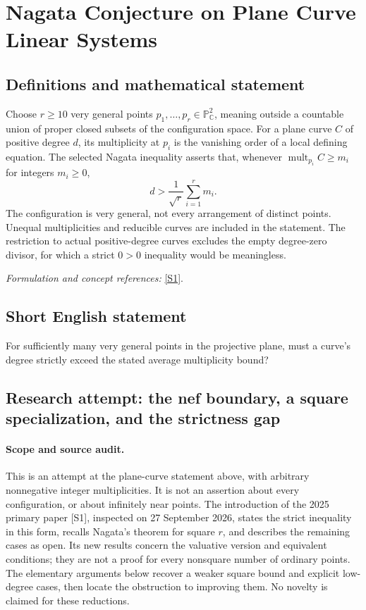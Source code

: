 \documentclass[11pt]{article}
\begin{document}
\section*{\texorpdfstring{Nagata Conjecture on Plane Curve Linear Systems}{Nagata Conjecture on Plane Curve Linear Systems}}\label{365}
\subsection{Definitions and mathematical statement}
Choose $r\ge10$ very general points $p_1,\ldots,p_r\in{\mathbb{P}}^2_{{\mathbb{C}}}$, meaning outside a countable union of proper closed subsets of the configuration space. For a plane curve $C$ of positive degree $d$, its multiplicity at $p_i$ is the vanishing order of a local defining equation. The selected Nagata inequality asserts that, whenever $\operatorname{mult}_{p_i}C\ge m_i$ for integers $m_i\ge0$,
\[
 d>\frac1{\sqrt r}\sum_{i=1}^r m_i.
\]
The configuration is very general, not every arrangement of distinct points. Unequal multiplicities and reducible curves are included in the statement. The restriction to actual positive-degree curves excludes the empty degree-zero divisor, for which a strict $0>0$ inequality would be meaningless.
\par\smallskip\textit{Formulation and concept references:} \href{https://link.springer.com/article/10.1007/s40687-025-00500-2}{[S1]}.

\subsection{Short English statement}
For sufficiently many very general points in the projective plane, must a curve's degree strictly exceed the stated average multiplicity bound?
\subsection{Research attempt: the nef boundary, a square specialization, and the strictness gap}
\paragraph{Scope and source audit.}
This is an attempt at the plane-curve statement above, with arbitrary nonnegative integer multiplicities. It is not an assertion about every configuration, or about infinitely near points. The introduction of the 2025 primary paper [S1], inspected on 27 September 2026, states the strict inequality in this form, recalls Nagata's theorem for square $r$, and describes the remaining cases as open. Its new results concern the valuative version and equivalent conditions; they are not a proof for every nonsquare number of ordinary points. The elementary arguments below recover a weaker square bound and explicit low-degree cases, then locate the obstruction to improving them. No novelty is claimed for these reductions.
\end{document}
